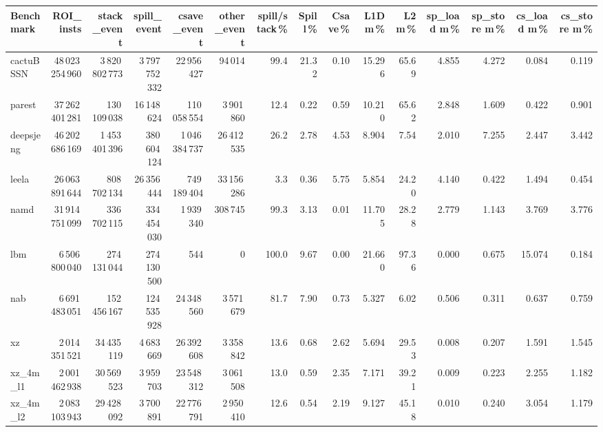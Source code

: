\documentclass[9pt,landscape,a4paper]{article}
\begin{document}
\vspace{2mm}
\centering
\begin{adjustbox}{max width=\textwidth, max totalheight=0.50\textheight}%
\begin{tabular}{lrrrrrrrrrrrrrr}
\toprule
Benchmark & ROI\_insts & stack\_event & \textbf{spill\_event} & csave\_event & other\_event & spill/stack\,\% & Spill\,\% & Csave\,\% & L1D m\,\% & L2 m\,\% & sp\_load m\,\% & sp\_store m\,\% & cs\_load m\,\% & cs\_store m\,\% \\
\midrule
cactuBSSN & 48\,023\,254\,960 & 3\,820\,802\,773 & 3\,797\,752\,332 & 22\,956\,427 & 94\,014 & 99.4 & 21.32 & 0.10 & 15.296 & 65.69 & 4.855 & 4.272 & 0.084 & 0.119 \\
parest & 37\,262\,401\,281 & 130\,109\,038 & 16\,148\,624 & 110\,058\,554 & 3\,901\,860 & 12.4 & 0.22 & 0.59 & 10.210 & 65.62 & 2.848 & 1.609 & 0.422 & 0.901 \\
deepsjeng & 46\,202\,686\,169 & 1\,453\,401\,396 & 380\,604\,124 & 1\,046\,384\,737 & 26\,412\,535 & 26.2 & 2.78 & 4.53 & 8.904 & 7.54 & 2.010 & 7.255 & 2.447 & 3.442 \\
leela & 26\,063\,891\,644 & 808\,702\,134 & 26\,356\,444 & 749\,189\,404 & 33\,156\,286 & 3.3 & 0.36 & 5.75 & 5.854 & 24.20 & 4.140 & 0.422 & 1.494 & 0.454 \\
namd & 31\,914\,751\,099 & 336\,702\,115 & 334\,454\,030 & 1\,939\,340 & 308\,745 & 99.3 & 3.13 & 0.01 & 11.705 & 28.28 & 2.779 & 1.143 & 3.769 & 3.776 \\
lbm & 6\,506\,800\,040 & 274\,131\,044 & 274\,130\,500 & 544 & 0 & 100.0 & 9.67 & 0.00 & 21.660 & 97.36 & 0.000 & 0.675 & 15.074 & 0.184 \\
nab & 6\,691\,483\,051 & 152\,456\,167 & 124\,535\,928 & 24\,348\,560 & 3\,571\,679 & 81.7 & 7.90 & 0.73 & 5.327 & 6.02 & 0.506 & 0.311 & 0.637 & 0.759 \\
xz & 2\,014\,351\,521 & 34\,435\,119 & 4\,683\,669 & 26\,392\,608 & 3\,358\,842 & 13.6 & 0.68 & 2.62 & 5.694 & 29.53 & 0.008 & 0.207 & 1.591 & 1.545 \\
xz\_4m\_l1 & 2\,001\,462\,938 & 30\,569\,523 & 3\,959\,703 & 23\,548\,312 & 3\,061\,508 & 13.0 & 0.59 & 2.35 & 7.171 & 39.21 & 0.009 & 0.223 & 2.255 & 1.182 \\
xz\_4m\_l2 & 2\,083\,103\,943 & 29\,428\,092 & 3\,700\,891 & 22\,776\,791 & 2\,950\,410 & 12.6 & 0.54 & 2.19 & 9.127 & 45.18 & 0.010 & 0.240 & 3.054 & 1.179 \\

\end{tabular}
\end{adjustbox}
\end{document}
